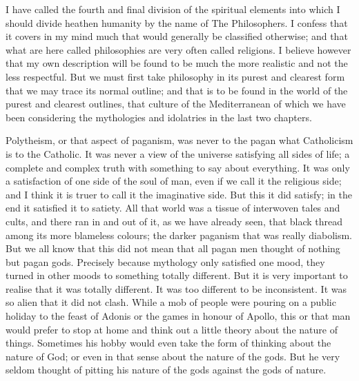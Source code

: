 I have called the fourth and final division of the spiritual elements into which I should divide heathen humanity by the name of The Philosophers. I confess that it covers in my mind much that would generally be classified otherwise; and that what are here called philosophies are very often called religions. I believe however that my own description will be found to be much the more realistic and not the less respectful. But we must first take philosophy in its purest and clearest form that we may trace its normal outline; and that is to be found in the world of the purest and clearest outlines, that culture of the Mediterranean of which we have been considering the mythologies and idolatries in the last two chapters.

Polytheism, or that aspect of paganism, was never to the pagan what Catholicism is to the Catholic. It was never a view of the universe satisfying all sides of life; a complete and complex truth with something to say about everything. It was only a satisfaction of one side of the soul of man, even if we call it the religious side; and I think it is truer to call it the imaginative side. But this it did satisfy; in the end it satisfied it to satiety. All that world was a tissue of interwoven tales and cults, and there ran in and out of it, as we have already seen, that black thread among its more blameless colours; the darker paganism that was really diabolism. But we all know that this did not mean that all pagan men thought of nothing but pagan gods. Precisely because mythology only satisfied one mood, they turned in other moods to something totally different. But it is very important to realise that it was totally different. It was too different to be inconsistent. It was so alien that it did not clash. While a mob of people were pouring on a public holiday to the feast of Adonis or the games in honour of Apollo, this or that man would prefer to stop at home and think out a little theory about the nature of things. Sometimes his hobby would even take the form of thinking about the nature of God; or even in that sense about the nature of the gods. But he very seldom thought of pitting his nature of the gods against the gods of nature.

